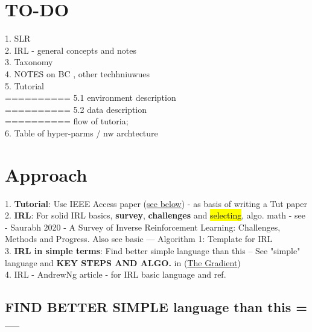 \documentclass{article}
\newcommand{\hlc}[2][blue!10]{{\colorlet{foo}{#1} \sethlcolor{foo}\hl{#2}}}
\begin{document}
	
	\section{TO-DO}
	
	1. SLR \\
	2. IRL - general concepts and notes \\
	3. Taxonomy \\
	4. NOTES on BC , other techhniuwues\\
	5. Tutorial \\
	========== 5.1 environment description\\
	========== 5.2 data  description\\
	========== flow of tutoria; \\
	
	6. Table of hyper-parms / nw archtecture\\
	
	
	
	\clearpage
	
	\section{Approach}
	
	1. \textbf{Tutorial}: Use IEEE Access paper (\href{https://ieeexplore.ieee.org/document/9086464}{see below}) - as basis of writing a Tut paper\\
	2. \textbf{IRL}: For solid IRL basics, \textbf{survey}, \textbf{challenges} and \hlc{selecting},  algo. math - see - Saurabh 2020 - A Survey of Inverse Reinforcement Learning: Challenges, Methods and Progress. Also see basic --- Algorithm 1: Template for IRL \\
	3. \textbf{IRL in simple terms}: Find better simple language than this --  See "simple" language and \textbf{KEY STEPS AND ALGO.} in (\href{https://thegradient.pub/learning-from-humans-what-is-inverse-reinforcement-learning/}{The Gradient}) \\
	4. IRL - AndrewNg article - for IRL basic language and ref. 
	
	\subsection{FIND BETTER SIMPLE language than this =--- }
	
\end{document}
